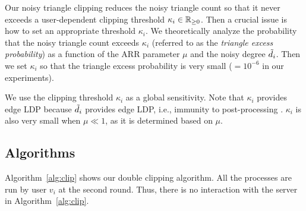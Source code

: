 Our noisy triangle clipping reduces the noisy triangle count so that it never exceeds a 
user-dependent clipping threshold 
$\kappa_i \in \mathbb{R}_{\ge0}$. 
Then a crucial issue is how to set 
an appropriate 
threshold 
$\kappa_i$. 
We theoretically analyze the probability that the noisy triangle count exceeds $\kappa_i$ 
(referred to as the \textit{triangle excess probability}) 
as a function of 
the ARR parameter $\mu$ and the 
noisy degree $\tilde{d}_i$. 
Then we set $\kappa_i$ so that 
the triangle excess probability 
is very small ($=10^{-6}$ in our experiments). 

We use the clipping threshold $\kappa_i$ as a global sensitivity. 
Note that $\kappa_i$ provides edge LDP because $\tilde{d}_i$ provides edge LDP, 
i.e., immunity to post-processing \cite{DP}. 
$\kappa_i$ is also very small when $\mu \ll 1$, as it is determined based on $\mu$. 


\subsection{Algorithms}
\label{sub:algorithms}
Algorithm~\ref{alg:clip} shows our double clipping algorithm. 
All the processes are run by user $v_i$ at the second round. 
Thus, there is no interaction with the server in Algorithm~\ref{alg:clip}.

